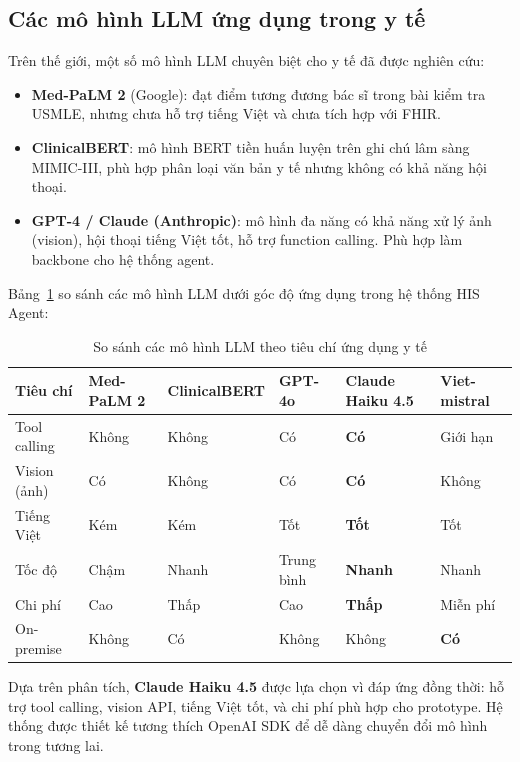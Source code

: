 \documentclass[oneside, a4paper]{book}
\theoremstyle{plain}
\theoremstyle{plain}
\theoremstyle{definition}
\theoremstyle{remark}
\begin{document}
\subsection{Các mô hình LLM ứng dụng trong y tế}

Trên thế giới, một số mô hình LLM chuyên biệt cho y tế đã được nghiên cứu:

\begin{itemize}
  \item \textbf{Med-PaLM 2} (Google): đạt điểm tương đương bác sĩ trong bài kiểm tra USMLE, nhưng chưa hỗ trợ tiếng Việt và chưa tích hợp với FHIR.
  \item \textbf{ClinicalBERT}: mô hình BERT tiền huấn luyện trên ghi chú lâm sàng MIMIC-III, phù hợp phân loại văn bản y tế nhưng không có khả năng hội thoại.
  \item \textbf{GPT-4 / Claude (Anthropic)}: mô hình đa năng có khả năng xử lý ảnh (vision), hội thoại tiếng Việt tốt, hỗ trợ function calling. Phù hợp làm backbone cho hệ thống agent.
\end{itemize}

Bảng~\ref{tab:llm-compare} so sánh các mô hình LLM dưới góc độ ứng dụng trong hệ thống HIS Agent:

\begin{table}[H]
\centering
\begin{tabular}{|p{2.8cm}|p{1.8cm}|p{1.8cm}|p{1.8cm}|p{1.8cm}|p{1.8cm}|}
\hline
\textbf{Tiêu chí} & \textbf{Med-PaLM 2} & \textbf{ClinicalBERT} & \textbf{GPT-4o} & \textbf{Claude Haiku 4.5} & \textbf{Viet-mistral} \\
\hline
Tool calling & Không & Không & Có & \textbf{Có} & Giới hạn \\
Vision (ảnh) & Có & Không & Có & \textbf{Có} & Không \\
Tiếng Việt & Kém & Kém & Tốt & \textbf{Tốt} & Tốt \\
Tốc độ & Chậm & Nhanh & Trung bình & \textbf{Nhanh} & Nhanh \\
Chi phí & Cao & Thấp & Cao & \textbf{Thấp} & Miễn phí \\
On-premise & Không & Có & Không & Không & \textbf{Có} \\
\hline
\end{tabular}
\caption{So sánh các mô hình LLM theo tiêu chí ứng dụng y tế}
\label{tab:llm-compare}
\end{table}

Dựa trên phân tích, \textbf{Claude Haiku 4.5} được lựa chọn vì đáp ứng đồng thời: hỗ trợ tool calling, vision API, tiếng Việt tốt, và chi phí phù hợp cho prototype. Hệ thống được thiết kế tương thích OpenAI SDK để dễ dàng chuyển đổi mô hình trong tương lai.
\end{document}
